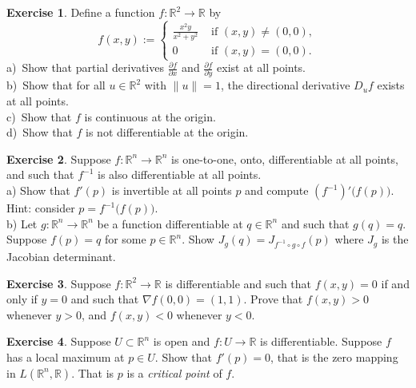 \documentclass[12pt]{book}
\newcommand{\snorm}[1]{\lVert {#1} \rVert}
\newcommand{\R}{{\mathbb{R}}}
\newcommand{\myindex}[1]{#1\index{#1}}
\theoremstyle{plain}
\theoremstyle{remark}
\theoremstyle{definition}
\theoremstyle{exercise}
\newtheorem{exercise}{Exercise}[section]
\theoremstyle{example}
\begin{document}
\begin{samepage}
\begin{exercise}
Define a function $f \colon \R^2 \to \R$ by
\begin{equation*}
f(x,y)
:=
\begin{cases}
\frac{x^2y}{x^2+y^2} & \text{ if $(x,y) \not= (0,0)$}, \\
0 & \text{ if $(x,y) = (0,0)$}.
\end{cases}
\end{equation*}
a)~Show that partial derivatives 
$\frac{\partial f}{\partial x}$ and
$\frac{\partial f}{\partial y}$ exist at all points.\\
b)~Show that for all $u \in \R^2$ with $\snorm{u}=1$, the directional
derivative $D_u f$ exists at all points.\\
c)~Show that $f$ is continuous at the origin.\\
d)~Show that $f$ is not differentiable at the origin.
\end{exercise}
\end{samepage}

\begin{exercise}
Suppose $f \colon \R^n \to \R^n$ is one-to-one, onto, differentiable at all
points, and such that $f^{-1}$ is also differentiable at all points.\\
a) Show that $f'(p)$ is invertible at all points $p$ and compute
${(f^{-1})}'\bigl(f(p)\bigr)$.  Hint: consider $p = f^{-1}\bigl(f(p)\bigr)$.\\
b) Let $g \colon \R^n \to \R^n$ be a function differentiable at $q \in \R^n$
and such that $g(q)=q$.  Suppose $f(p) = q$ for some $p \in \R^n$.
Show $J_g(q) = J_{f^{-1} \circ g \circ f}(p)$ where $J_g$ is the Jacobian
determinant.
\end{exercise}

\begin{exercise}
Suppose $f \colon \R^2 \to \R$ is differentiable and such that
$f(x,y) = 0$ if and only if $y=0$ and such that $\nabla f(0,0) = (1,1)$.
Prove that $f(x,y) > 0$ whenever $y > 0$, and
$f(x,y) < 0$ whenever $y < 0$.
\end{exercise}

\begin{exercise} \label{exercise:mv:maximumcritical}
Suppose $U \subset \R^n$ is open and
$f \colon U \to \R$ is differentiable.  Suppose $f$ has a local maximum
at $p \in U$.  Show that $f'(p) = 0$, that is the zero mapping in
$L(\R^n,\R)$.  That is $p$ is a
\emph{\myindex{critical point}} of $f$.
\end{exercise}
\end{document}
